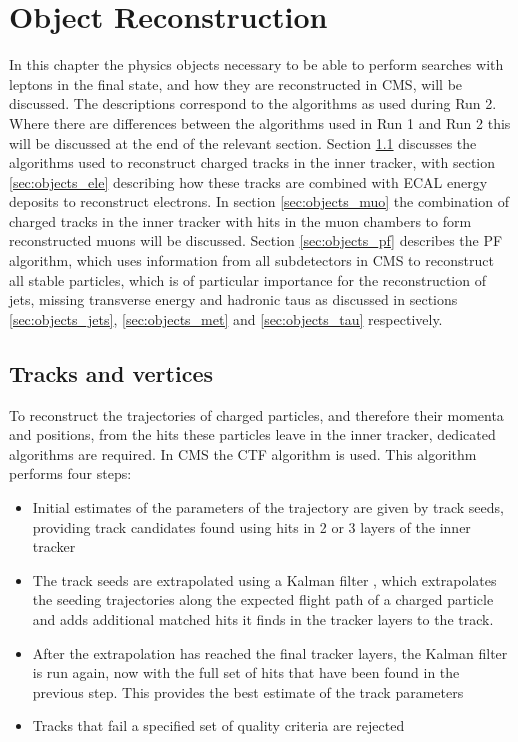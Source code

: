 \chapter{Object Reconstruction}
\label{chap:objects}

In this chapter the physics objects necessary to be able to perform searches with \Pgt leptons
in the final state, and how they are reconstructed in \ac{CMS}, will be discussed. The 
descriptions correspond to the algorithms as used during Run 2. Where there are differences
between the algorithms used in Run 1 and Run 2 this will be discussed at the end
of the relevant section. Section \ref{sec:objects_pv} discusses the algorithms
used to reconstruct charged tracks in the inner tracker, with section \ref{sec:objects_ele}
describing how these tracks are combined with \ac{ECAL} energy deposits to reconstruct electrons.
In section \ref{sec:objects_muo} the combination of charged tracks in the inner tracker with
hits in the muon chambers to form reconstructed muons will be discussed. Section \ref{sec:objects_pf}
describes the \ac{PF} algorithm, which uses information from all subdetectors in \ac{CMS} to reconstruct
all stable particles, which is of particular importance for the reconstruction of jets, missing transverse
energy and hadronic taus as discussed in sections \ref{sec:objects_jets}, \ref{sec:objects_met} and \ref{sec:objects_tau} 
respectively.

\section{Tracks and vertices}
\label{sec:objects_pv}
To reconstruct the trajectories of charged particles, and therefore
their momenta and positions, from the hits these particles leave in the 
inner tracker, dedicated algorithms are required. In \ac{CMS} the
\ac{CTF} algorithm is used. This algorithm performs four steps:
\begin{itemize}
\setlength{\itemsep}{-\baselineskip}
\item Initial estimates of the parameters of the trajectory are given by track seeds, providing track candidates found using hits in 2 or 3 layers of the inner tracker
\item The track seeds are extrapolated using a Kalman filter \cite{trk-kf}, which extrapolates the seeding trajectories along the expected flight path of a charged particle 
and adds additional matched hits it finds in the tracker layers to the track.
\item After the extrapolation has reached the final tracker layers, the Kalman filter is run again, now with the full set of hits that have been found in the previous step.
This provides the best estimate of the track parameters
\item Tracks that fail a specified set of quality criteria are rejected
\end{itemize}

